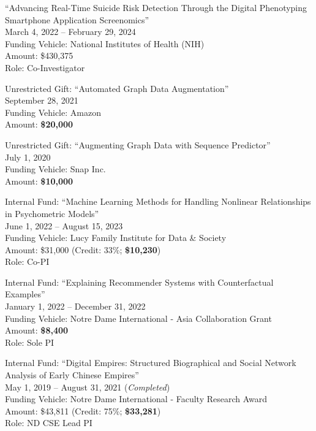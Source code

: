 \documentclass[10pt]{article}
\newenvironment{myindentpar}[1]%
{\begin{list}{}%
         {\setlength{\leftmargin}{#1}}%
         \item[]%
}
{\end{list}}
\newcounter{list}
\begin{document}
\begin{myindentpar}{0.75cm}
\hspace{-0.75cm}``Advancing Real-Time Suicide Risk Detection Through the Digital Phenotyping Smartphone Application Screenomics'' \\
March 4, 2022 -- February 29, 2024 \\
Funding Vehicle: National Institutes of Health  (NIH) \\
Amount: \$430,375 \\
Role: {Co-Investigator}

\hspace{-0.75cm}Unrestricted Gift: ``Automated Graph Data Augmentation''\\
September 28, 2021 \\
Funding Vehicle: Amazon \\
Amount: \textbf{\$20,000}

\hspace{-0.75cm}Unrestricted Gift: ``Augmenting Graph Data with Sequence Predictor'' \\
July 1, 2020 \\
Funding Vehicle: Snap Inc. \\
Amount: \textbf{\$10,000}

\hspace{-0.75cm}Internal Fund: ``Machine Learning Methods for Handling Nonlinear Relationships in Psychometric Models'' \\
June 1, 2022 -- August 15, 2023 \\
Funding Vehicle: Lucy Family Institute for Data \& Society \\
Amount: \$31,000 (Credit: 33\%; \textbf{\$10,230}) \\
Role: {Co-PI}

\hspace{-0.75cm}Internal Fund: ``Explaining Recommender Systems with Counterfactual Examples''\\
January 1, 2022 -- December 31, 2022 \\
Funding Vehicle: Notre Dame International - Asia Collaboration Grant \\
Amount: \textbf{\$8,400} \\
Role: {Sole PI}

\hspace{-0.75cm}Internal Fund: ``Digital Empires: Structured Biographical and Social Network Analysis of Early Chinese Empires'' \\
May 1, 2019 -- August 31, 2021 (\emph{Completed}) \\
Funding Vehicle: Notre Dame International - Faculty Research Award \\
Amount: \$43,811 (Credit: 75\%; \textbf{\$33,281}) \\
Role: {ND CSE Lead PI}

\end{myindentpar}
\end{document}
